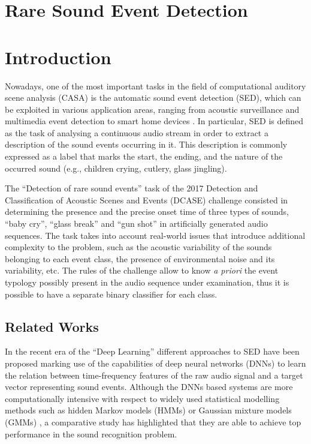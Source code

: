 \section{Rare Sound Event Detection}

\section{Introduction}
\label{sec:intro}
Nowadays, one of the most important tasks in the field of computational auditory scene analysis (CASA) is the automatic sound event detection (SED), which can be exploited in various application areas, ranging from acoustic surveillance \cite{clavel2005events,foggia2015reliable} and multimedia event detection \cite{wang2016audio} to smart home devices \cite{krstulovic2018audio,wirn2017-fall, Principi2016a}.
In particular, SED is defined as the task of analysing a continuous audio stream in order to extract a description of the sound events occurring in it. This description is commonly expressed as a label that marks the start, the ending, and the nature of the occurred sound (e.g., children crying, cutlery, glass jingling).

The ``Detection of rare sound events'' task of the 2017 Detection and Classification of Acoustic Scenes and Events (DCASE) challenge \cite{DCASE2017Workshop} consisted in determining the presence and the precise onset time of three types of sounds, ``baby cry'', ``glass break'' and ``gun shot'' in artificially generated audio sequences. %
The task takes into account real-world issues that introduce additional complexity to the problem, such as the acoustic variability of the sounds belonging to each event class, the presence of environmental noise and its variability, etc. The rules of the challenge allow to know \textit{a priori} the event typology possibly present in the audio sequence under examination, thus it is possible to have a separate binary classifier for each class.

\subsection{Related Works}
In the recent era of the ``Deep Learning'' different approaches to SED have been proposed marking use of the capabilities of deep neural networks (DNNs) to learn the relation between time-frequency features of the raw
audio signal and a target vector representing sound events.
Although the DNNs based systems are more computationally intensive with respect to  widely used statistical modelling methods such as hidden Markov models (HMMs) or Gaussian mixture models (GMMs)  \cite{heittola2010audio, peng2009healthcare}, a comparative study \cite{sigtia2016automatic} has highlighted that they are able to achieve top performance in the sound recognition problem.

